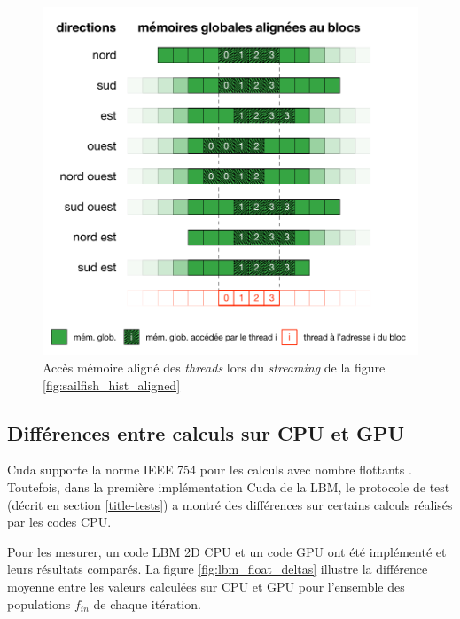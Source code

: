 \begin{figure}[h]
	\centering
	\includegraphics[fbox,scale=0.95]{images/streaming/sailfish_hist_dir_aligned.pdf}
	\caption{Accès mémoire aligné des \textit{threads} lors du \textit{streaming} de la figure \ref{fig:sailfish_hist_aligned}}
	\label{fig:sailfish_hist_dir_aligned}
\end{figure}

\subsection{Différences entre calculs sur CPU et GPU} \label{title-floats}
Cuda supporte la norme IEEE 754 pour les calculs avec nombre flottants \cite{noauthor_cuda_2017}. Toutefois, dans la première implémentation Cuda de la \acs{LBM}, le protocole de test (décrit en section \ref{title-tests}) a montré des différences sur certains calculs réalisés par les codes \ac{CPU}.

Pour les mesurer, un code \ac{LBM} 2D \ac{CPU} et un code \ac{GPU} ont été implémenté et leurs résultats comparés. La figure \ref{fig:lbm_float_deltas} illustre la différence moyenne entre les valeurs calculées sur \ac{CPU} et \ac{GPU} pour l'ensemble des populations $f_{in}$ de chaque itération.

